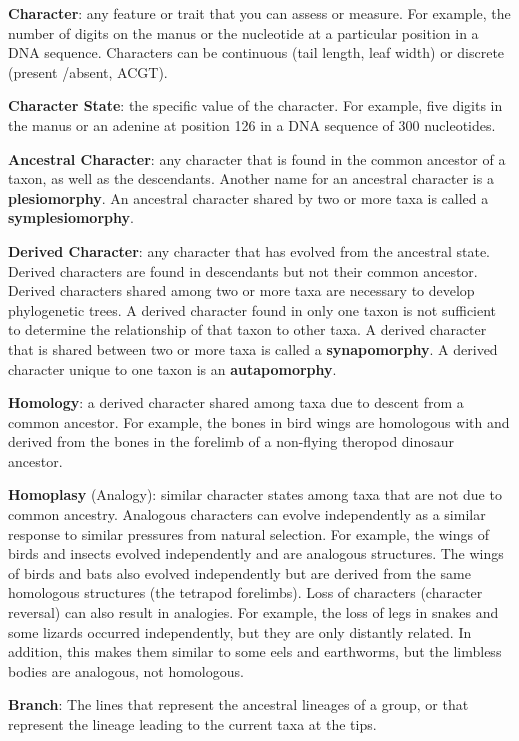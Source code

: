 \documentclass[letterpaper]{tufte-handout}
\begin{document}
\textbf{Character}: any feature or trait that you can assess or measure.  For example, the number of digits on the manus or the nucleotide at a particular position in a DNA sequence.  Characters can be continuous (tail length, leaf width) or discrete (present /absent, ACGT).

\textbf{Character State}: the specific value of the character. For example, five digits in the manus or an adenine at position 126 in a DNA sequence of 300 nucleotides. 

\textbf{Ancestral Character}: any character that is found in the common ancestor of a taxon, as well as the descendants.  Another name for an ancestral character is a \textbf{plesiomorphy}. An ancestral character shared by two or more taxa is called a \textbf{symplesiomorphy}.

\textbf{Derived Character}: any character that has evolved from the ancestral state. Derived characters are found in descendants but not their common ancestor. Derived characters shared among two or more taxa are necessary to develop phylogenetic trees.  A derived character found in only one taxon is not sufficient to determine the relationship of that taxon to other taxa.  A derived character that is shared between two or more taxa is called a \textbf{synapomorphy}.  A derived character unique to one taxon is an \textbf{autapomorphy}.

\textbf{Homology}: a derived character shared among taxa due to descent from a common ancestor. For example, the bones in bird wings are homologous with and derived from the bones in the forelimb of a non-flying theropod dinosaur ancestor.

\textbf{Homoplasy} (Analogy): similar character states among taxa that are not due to common ancestry. Analogous characters can evolve independently as a similar response to similar pressures from natural selection. For example, the wings of birds and insects evolved independently and are analogous structures.  The wings of birds and bats also evolved independently but are derived from the same homologous structures (the tetrapod forelimbs). Loss of characters (character reversal) can also result in analogies. For example, the loss of legs in snakes and some lizards occurred independently, but they are only distantly related. In addition, this makes them similar to some eels and earthworms, but the limbless bodies are analogous, not homologous. 

\textbf{Branch}: The lines that represent the ancestral lineages of a group, or that represent the lineage leading to the current taxa at the tips.
\end{document}
